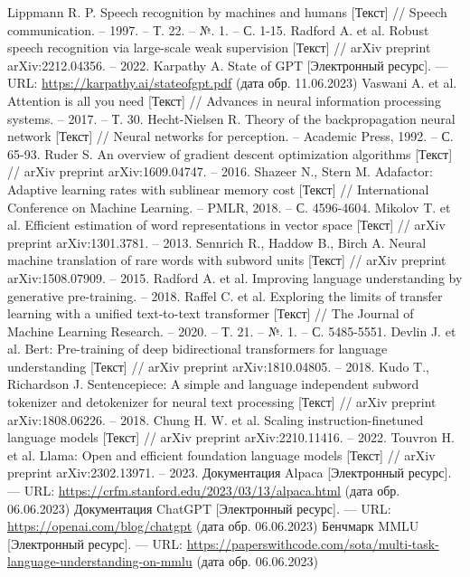 \begin{thebibliography}{99}
  Lippmann R. P. Speech recognition by machines and humans [Текст] // Speech communication. – 1997. – Т. 22. – №. 1. – С. 1-15.
  Radford A. et al. Robust speech recognition via large-scale weak supervision [Текст] // arXiv preprint arXiv:2212.04356. – 2022.
  Karpathy A. State of GPT [Электронный ресурс]. --- URL: \url{https://karpathy.ai/stateofgpt.pdf} (дата обр. 11.06.2023)
  Vaswani A. et al. Attention is all you need [Текст] // Advances in neural information processing systems. – 2017. – Т. 30.
  Hecht-Nielsen R. Theory of the backpropagation neural network [Текст] // Neural networks for perception. – Academic Press, 1992. – С. 65-93.
  Ruder S. An overview of gradient descent optimization algorithms [Текст] // arXiv preprint arXiv:1609.04747. – 2016.
  Shazeer N., Stern M. Adafactor: Adaptive learning rates with sublinear memory cost [Текст] // International Conference on Machine Learning. – PMLR, 2018. – С. 4596-4604.
  Mikolov T. et al. Efficient estimation of word representations in vector space [Текст] // arXiv preprint arXiv:1301.3781. – 2013.
  Sennrich R., Haddow B., Birch A. Neural machine translation of rare words with subword units [Текст] // arXiv preprint arXiv:1508.07909. – 2015.
  Radford A. et al. Improving language understanding by generative pre-training. – 2018.
  Raffel C. et al. Exploring the limits of transfer learning with a unified text-to-text transformer [Текст] // The Journal of Machine Learning Research. – 2020. – Т. 21. – №. 1. – С. 5485-5551.
  Devlin J. et al. Bert: Pre-training of deep bidirectional transformers for language understanding [Текст] // arXiv preprint arXiv:1810.04805. – 2018.
  Kudo T., Richardson J. Sentencepiece: A simple and language independent subword tokenizer and detokenizer for neural text processing [Текст] // arXiv preprint arXiv:1808.06226. – 2018.
  Chung H. W. et al. Scaling instruction-finetuned language models [Текст] // arXiv preprint arXiv:2210.11416. – 2022.
  Touvron H. et al. Llama: Open and efficient foundation language models [Текст] // arXiv preprint arXiv:2302.13971. – 2023.
  Документация Alpaca [Электронный ресурс]. --- URL: \url{https://crfm.stanford.edu/2023/03/13/alpaca.html} (дата обр. 06.06.2023)
  Документация ChatGPT [Электронный ресурс]. --- URL: \url{https://openai.com/blog/chatgpt} (дата обр. 06.06.2023)
  Бенчмарк MMLU [Электронный ресурс]. --- URL: \url{https://paperswithcode.com/sota/multi-task-language-understanding-on-mmlu} (дата обр. 06.06.2023)
\end{thebibliography}